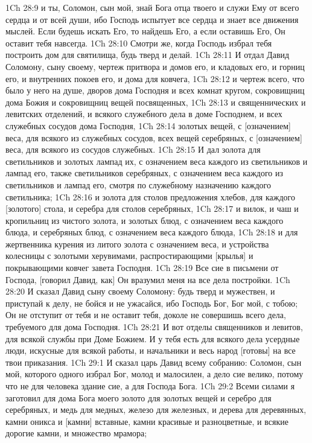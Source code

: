 1Ch 28:9  и ты, Соломон, сын мой, знай Бога отца твоего и служи Ему от всего сердца и от всей души, ибо Господь испытует все сердца и знает все движения мыслей. Если будешь искать Его, то найдешь Его, а если оставишь Его, Он оставит тебя навсегда.
1Ch 28:10  Смотри же, когда Господь избрал тебя построить дом для святилища, будь тверд и делай.
1Ch 28:11  И отдал Давид Соломону, сыну своему, чертеж притвора и домов его, и кладовых его, и горниц его, и внутренних покоев его, и дома для ковчега,
1Ch 28:12  и чертеж всего, что было у него на душе, дворов дома Господня и всех комнат кругом, сокровищниц дома Божия и сокровищниц вещей посвященных,
1Ch 28:13  и священнических и левитских отделений, и всякого служебного дела в доме Господнем, и всех служебных сосудов дома Господня,
1Ch 28:14  золотых вещей, с [означением] веса, для всякого из служебных сосудов, всех вещей серебряных, с [означением] веса, для всякого из сосудов служебных.
1Ch 28:15  И дал золота для светильников и золотых лампад их, с означением веса каждого из светильников и лампад его, также светильников серебряных, с означением веса каждого из светильников и лампад его, смотря по служебному назначению каждого светильника;
1Ch 28:16  и золота для столов предложения хлебов, для каждого [золотого] стола, и серебра для столов серебряных,
1Ch 28:17  и вилок, и чаш и кропильниц из чистого золота, и золотых блюд, с означением веса каждого блюда, и серебряных блюд, с означением веса каждого блюда,
1Ch 28:18  и для жертвенника курения из литого золота с означением веса, и устройства колесницы с золотыми херувимами, распростирающими [крылья] и покрывающими ковчег завета Господня.
1Ch 28:19  Все сие в письмени от Господа, [говорил Давид, как] Он вразумил меня на все дела постройки.
1Ch 28:20  И сказал Давид сыну своему Соломону: будь тверд и мужествен, и приступай к делу, не бойся и не ужасайся, ибо Господь Бог, Бог мой, с тобою; Он не отступит от тебя и не оставит тебя, доколе не совершишь всего дела, требуемого для дома Господня.
1Ch 28:21  И вот отделы священников и левитов, для всякой службы при Доме Божием. И у тебя есть для всякого дела усердные люди, искусные для всякой работы, и начальники и весь народ [готовы] на все твои приказания.
1Ch 29:1  И сказал царь Давид всему собранию: Соломон, сын мой, которого одного избрал Бог, молод и малосилен, а дело сие велико, потому что не для человека здание сие, а для Господа Бога.
1Ch 29:2  Всеми силами я заготовил для дома Бога моего золото для золотых вещей и серебро для серебряных, и медь для медных, железо для железных, и дерева для деревянных, камни оникса и [камни] вставные, камни красивые и разноцветные, и всякие дорогие камни, и множество мрамора;
